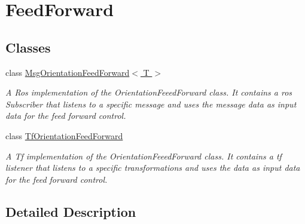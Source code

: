 \hypertarget{group__FeedForward}{}\section{Feed\+Forward}
\label{group__FeedForward}
\subsection*{Classes}
\begin{DoxyCompactItemize}
\item 
class \hyperlink{classMsgOrientationFeedForward}{Msg\+Orientation\+Feed\+Forward$<$ T $>$}
\begin{DoxyCompactList}\small\item\em A Ros implementation of the Orientation\+Feeed\+Forward class. It contains a ros Subscriber that listens to a specific message and uses the message data as input data for the feed forward control. \end{DoxyCompactList}\item 
class \hyperlink{classTfOrientationFeedForward}{Tf\+Orientation\+Feed\+Forward}
\begin{DoxyCompactList}\small\item\em A Tf implementation of the Orientation\+Feeed\+Forward class. It contains a tf listener that listens to a specific transformations and uses the data as input data for the feed forward control. \end{DoxyCompactList}\end{DoxyCompactItemize}


\subsection{Detailed Description}
